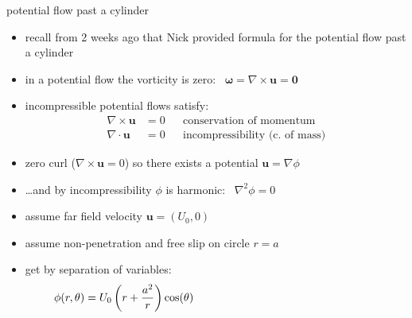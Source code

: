 \documentclass[10pt,hyperref]{beamer}
\newcommand{\bu}{\mathbf{u}}
\newcommand{\bzero}{\bm{0}}
\newcommand{\grad}{\nabla}
\newcommand{\Div}{\nabla\cdot}
\newcommand{\Curl}{\nabla\times}
\begin{document}
\begin{frame}{potential flow past a cylinder}

\begin{itemize}
\item recall from 2 weeks ago that Nick provided formula for the potential flow past a cylinder
\item in a \alert{potential flow} the vorticity is zero: \, $\bm{\omega}=\Curl\bu=\bzero$
\item incompressible potential flows satisfy:
\begin{align*}
\Curl \bu &= 0 & &\text{conservation of momentum} \\
\Div \bu &= 0 & &\text{incompressibility (c.~of mass)}
\end{align*}
\item zero curl ($\Curl\bu=0$) so there exists a potential $\bu = \grad \phi$
\item \dots and by incompressibility $\phi$ is harmonic: \, $\grad^2 \phi = 0$
\item assume far field velocity $\bu=(U_0,0)$
\item assume non-penetration and free slip on circle $r=a$
\item get by separation of variables:
	$$\phi(r,\theta) = U_0 \left(r + \frac{a^2}{r}\right) \cos(\theta) \hspace{2.3in}$$
\end{itemize}
\end{frame}
\end{document}
